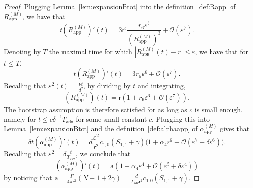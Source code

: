 \documentclass[11pt,reqno,a4paper]{amsart}
\def\eps{\varepsilon}
\newcommand{\cO}{\mathcal{O}}
\newcommand{\adv}{\mathsf{adv}}
\newcommand{\1}{\mathbbm{1}}
\theoremstyle{definition}
\theoremstyle{definition}
\numberwithin{equation}{section}
\newcommand{\Mapp}[2]{#1^{(#2)}_\mathrm{app}}
\begin{document}
\begin{proof}
        Plugging Lemma~\ref{lem:expansionBtot} into the definition~\cref{def:Rapp} of $\Mapp{R}{M}$, we have that
    \begin{equation}
        t (\Mapp{R}{M})'(t) = 3\mathsf{r}^4\frac{r_6\eps^6}{(\Mapp{R}{M})^3}  + \cO(\eps^7).
    \end{equation}
    Denoting by $T$ the maximal time for which $|\Mapp{R}{M}(t) - r| \le \eps$, we have that for $t \le T$,
    \begin{equation}
        t (\Mapp{R}{M})'(t) = 3r_6\eps^6  + \cO(\eps^7).
    \end{equation}
    Recalling that $\eps^2(t) = \frac{\nu t}{d^2}$, by dividing by $t$ and integrating,
    \begin{equation}
        (\Mapp{R}{M})(t) = \mathsf{r}(1 + r_6\eps^6  + \cO(\eps^7)).
    \end{equation}
    The bootstrap assumption is therefore satisfied for as long as $\eps$ is small enough, namely for $t \le c \delta^{-1} T_\adv$ for some small constant $c$. 
    Plugging this into Lemma~\ref{lem:expansionBtot} and the definition~\cref{def:alphaapp} of $\Mapp{\alpha}{M}$ gives that
    \begin{equation}
    \label{eq:alphaappMproof}
        \delta t(\Mapp{\alpha}{M})'(t) = d\frac{\eps^2}{\mathsf{r}^2} c_{1,0} (S_{1,1}+\gamma)\Big( 1 + \alpha_4 \eps^6 
        + \cO(\eps^7 + \delta \eps^6)\Big).
    \end{equation}
    Recalling that $\eps^2 = \delta \frac{t}{T_\adv}$, we conclude that
\begin{equation}
    (\Mapp{\alpha}{M})'(t) = \mathsf{a}(1 + \alpha_4 \eps^4 + \cO(\eps^5 + \delta \eps^4))
\end{equation}
by noticing that $\mathsf{a} =\frac{\Gamma}{4\pi \mathsf{r}^2}(N-1+2\gamma) = \frac{d}{T_\adv \mathsf{r}^2} c_{1,0}(S_{1,1}+\gamma).$ 
\end{proof}
\end{document}
